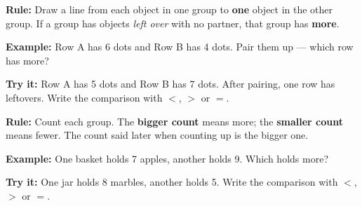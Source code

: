 \documentclass[12pt]{article}
\begin{document}


\begin{formulabox}
\textbf{Rule:} Draw a line from each object in one group to \textbf{one}
object in the other group. If a group has objects \emph{left over} with no
partner, that group has \textbf{more}.
\end{formulabox}

\begin{examplebox}
\textbf{Example:} \quad Row A has 6 dots and Row B has 4 dots. Pair them up
--- which row has more?
\end{examplebox}

\begin{tryitbox}
\textbf{Try it:} \quad Row A has 5 dots and Row B has 7 dots. After pairing,
one row has leftovers. Write the comparison with $<$, $>$ or $=$.\\[2pt]
\end{tryitbox}


\begin{formulabox}
\textbf{Rule:} Count each group. The \textbf{bigger count} means more; the
\textbf{smaller count} means fewer. The count said later when counting up is
the bigger one.
\end{formulabox}

\begin{examplebox}
\textbf{Example:} \quad One basket holds 7 apples, another holds 9. Which
holds more?
\end{examplebox}

\begin{tryitbox}
\textbf{Try it:} \quad One jar holds 8 marbles, another holds 5. Write the
comparison with $<$, $>$ or $=$.\\[2pt]
\end{tryitbox}
\end{document}
